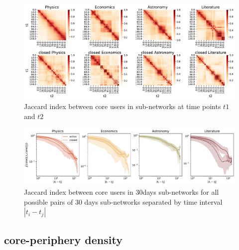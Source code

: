 \begin{figure}[h!]
	\centering
	\includegraphics[width=\linewidth]{figures/stackexchange/jaccard_heatmap.pdf}
	\caption{Jaccard index between core users in  sub-networks at time points $t1$ and $t2$}
	\label{fig:jaccard_hm}
\end{figure}

\begin{figure}[h!]
	\centering
	\includegraphics[width=\linewidth]{figures/stackexchange/jaccard.pdf}
	\caption{Jaccard index between core users in 30days sub-networks for all possible pairs of 30 days sub-networks separated by time interval $|t_i - t_j|$}
	\label{fig:jaccard_mean}
\end{figure}

\subsection{core-periphery density}

